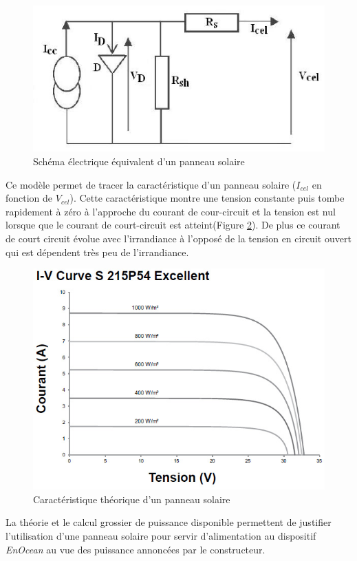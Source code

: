 \documentclass{rapportENS}
\begin{document}
\begin{figure}[h!]
    \centering
    \includegraphics[width=0.9\linewidth]{schema_pv.png}
    \caption{Schéma électrique équivalent d'un panneau solaire}
    \label{fig:schema_pv}
\end{figure}

Ce modèle permet de tracer la caractéristique d'un panneau solaire ($I_{cel}$ en fonction de $V_{cel} $). Cette caractéristique montre une tension constante puis tombe rapidement à zéro à l'approche du courant de cour-circuit et la tension est nul lorsque que le courant de court-circuit est atteint(Figure \ref{fig:caracteristique_pv}). De plus ce courant de court circuit évolue avec l'irrandiance  à l'opposé de la tension en circuit ouvert qui est dépendent très peu de l'irrandiance.

\begin{figure}[h!]
    \centering
   
    \includegraphics[width=0.7\linewidth]{caracteristique_pv.jpg}
    \caption{Caractéristique théorique d'un panneau solaire}
    \label{fig:caracteristique_pv}
    
\end{figure}

La théorie et le calcul grossier de puissance disponible permettent de justifier l'utilisation d'une panneau solaire pour servir d'alimentation au dispositif \textit{EnOcean} au vue des puissance annoncées par le constructeur.
\end{document}
